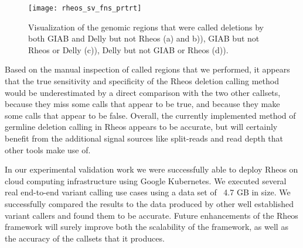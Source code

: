\begin{figure}[h!]
    \texttt{[image: rheos\_sv\_fns\_prtrt]}
    \centering
    \caption {Visualization of the genomic regions that were called deletions by both GIAB and Delly but not Rheos (a) and b)), GIAB but not Rheos or Delly (c)), Delly but not GIAB or Rheos (d)).}
    \label{fig:rheos_sv_fns}
\end{figure}

Based on the manual inspection of called regions that we performed, it appears that the true sensitivity and specificity of the Rheos deletion calling method would be underestimated by a direct comparison with the two other callsets, because they miss some calls that appear to be true, and because they make some calls that appear to be false. Overall, the currently implemented method of germline deletion calling in Rheos appears to be accurate, but will certainly benefit from the additional signal sources like split-reads and read depth that other tools make use of.

In our experimental validation work we were successfully able to deploy Rheos on cloud computing infrastructure using Google Kubernetes. We executed several real end-to-end variant calling use cases using a data set of ~4.7 GB in size. We successfully compared the results to the data produced by other well established variant callers and found them to be accurate. Future enhancements of the Rheos framework will surely improve both the scalability of the framework, as well as the accuracy of the callsets that it produces.
